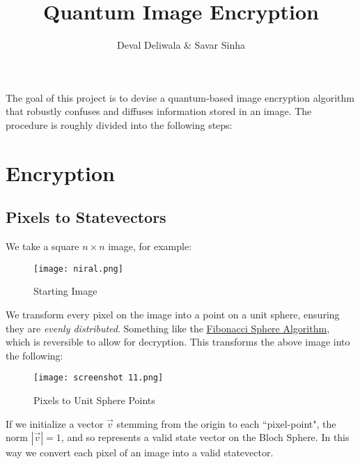\documentclass[svgnames]{article}     %
\title{Quantum Image Encryption}
\author{Deval Deliwala \& Savar Sinha}
\begin{document}
\maketitle


The goal of this project is to devise a quantum-based image encryption algorithm that
robustly confuses and diffuses information stored in an image. The procedure is
roughly divided into the following steps: 

\section{Encryption}

\subsection{Pixels to Statevectors}

We take a square $n \times n$ image, for example: 

\begin{figure}[H]
  \centering
    \texttt{[image: niral.png]}
    \caption{Starting Image}
\end{figure}

We transform every pixel on the image into a point on a unit sphere, ensuring
they are \textit{evenly distributed}. Something like the
\href{https://arxiv.org/pdf/0912.4540}{Fibonacci Sphere Algorithm}, which is
reversible to allow for decryption. This
transforms the above image into the following: 

\begin{figure}[H]
  \centering
    \texttt{[image: screenshot 11.png]}
    \caption{Pixels to Unit Sphere Points}
\end{figure}


If we initialize a vector $\vec{v}$ stemming from the origin to each
``pixel-point", the norm $|\vec{v}| = 1$, and so represents a valid state vector
on the Bloch Sphere. In this way we convert each pixel of an image into a valid
statevector.\\
\end{document}
